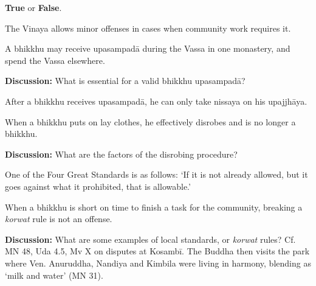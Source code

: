 \begin{exam}{\autoExamName}
\problemDivide

\begin{problem*}

  \textbf{True} or \textbf{False}.

  \bigskip

  \begin{parts}

    \item {} The Vinaya allows minor offenses in cases when community work requires it.

    \bigskip

    \item {} A bhikkhu may receive upasampadā during the Vassa in one
    monastery, and spend the Vassa elsewhere.

    \bigskip

    \textbf{Discussion:} What is essential for a valid bhikkhu upasampadā?

    \bigskip

    \item {} After a bhikkhu receives upasampadā, he can only take nissaya
    on his upajjhāya.

    \bigskip

    \item {} When a bhikkhu puts on lay clothes, he effectively disrobes and
    is no longer a bhikkhu.

    \bigskip

    \textbf{Discussion:} What are the factors of the disrobing procedure?

    \bigskip

    \item {} One of the Four Great Standards is as follows: `If it is not
    already allowed, but it goes against what it prohibited, that is allowable.'

    \bigskip

    \item {} When a bhikkhu is short on time to finish a task for the
    community, breaking a \emph{korwat} rule is not an offense.

    \bigskip

    \textbf{Discussion:} What are some examples of local standards, or \emph{korwat}
    rules? Cf. MN 48, Uda 4.5, Mv X on disputes at Kosambī. The Buddha then visits
    the park where Ven. Anuruddha, Nandiya and Kimbila were living in harmony,
    blending as `milk and water' (MN 31).

  \end{parts}

\end{problem*}

\end{exam}


